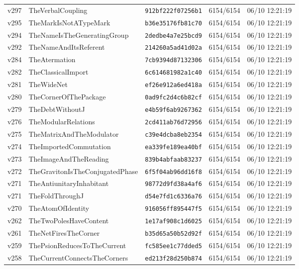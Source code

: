 \documentclass[11pt]{article}
\theoremstyle{definition}\newtheorem{deriv}{Derivation}
\begin{document}
{\begin{longtable}{@{}lllll@{}}
v297 & TheVerbalCoupling & \texttt{912bf222f07256b1} & 6154/6154 & 06/10 12:21:19 \\
v295 & TheMarkIsNotATypeMark & \texttt{b36e35176fb81c70} & 6154/6154 & 06/10 12:21:19 \\
v294 & TheNameIsTheGeneratingGroup & \texttt{2dedbe4a7e25bcd9} & 6154/6154 & 06/10 12:21:19 \\
v292 & TheNameAndItsReferent & \texttt{214260a5ad41d02a} & 6154/6154 & 06/10 12:21:19 \\
v284 & TheAtermation & \texttt{7cb9394d87132306} & 6154/6154 & 06/10 12:21:19 \\
v282 & TheClassicalImport & \texttt{6c614681982a1c40} & 6154/6154 & 06/10 12:21:19 \\
v281 & TheWideNet & \texttt{ef26e912a6ed418a} & 6154/6154 & 06/10 12:21:19 \\
v280 & TheCornerOfThePackage & \texttt{0ad9fc2d4c6b82cf} & 6154/6154 & 06/10 12:21:19 \\
v279 & TheDebtWithoutJ & \texttt{e4b59f6ab9267362} & 6154/6154 & 06/10 12:21:19 \\
v276 & TheModularRelations & \texttt{2cd411ab76d72956} & 6154/6154 & 06/10 12:21:19 \\
v275 & TheMatrixAndTheModulator & \texttt{c39e4dcba8eb2354} & 6154/6154 & 06/10 12:21:19 \\
v274 & TheImportedCommutation & \texttt{ea339fe189ea40bf} & 6154/6154 & 06/10 12:21:19 \\
v273 & TheImageAndTheReading & \texttt{839b4abfaab83237} & 6154/6154 & 06/10 12:21:19 \\
v272 & TheGravitonIsTheConjugatedPhase & \texttt{6f5f04ab96dd16f8} & 6154/6154 & 06/10 12:21:19 \\
v271 & TheAntiunitaryInhabitant & \texttt{98772d9fd38a4af6} & 6154/6154 & 06/10 12:21:19 \\
v271 & TheFoldThroughJ & \texttt{d54e7fd1c6336a76} & 6154/6154 & 06/10 12:21:19 \\
v270 & TheAtomOfIdentity & \texttt{916056ff895447f5} & 6154/6154 & 06/10 12:21:19 \\
v262 & TheTwoPolesHaveContent & \texttt{1e17af908c1d6025} & 6154/6154 & 06/10 12:21:19 \\
v261 & TheNetFiresTheCorner & \texttt{b35d65a50b52d92f} & 6154/6154 & 06/10 12:21:19 \\
v259 & ThePsionReducesToTheCurrent & \texttt{fc585ee1c77dded5} & 6154/6154 & 06/10 12:21:19 \\
v258 & TheCurrentConnectsTheCorners & \texttt{ed213f28d250b874} & 6154/6154 & 06/10 12:21:19 \\

\end{longtable}}
\end{document}
